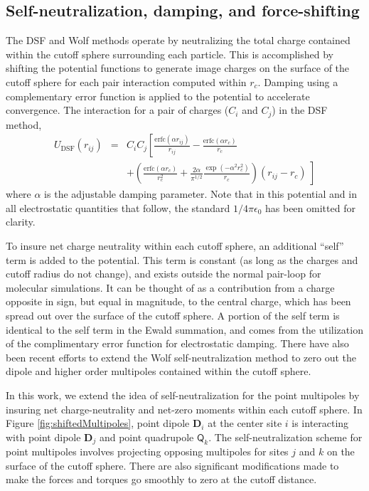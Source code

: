 \subsection{Self-neutralization, damping, and force-shifting}
The DSF and Wolf methods operate by neutralizing the total charge
contained within the cutoff sphere surrounding each particle.  This is
accomplished by shifting the potential functions to generate image
charges on the surface of the cutoff sphere for each pair interaction
computed within $r_c$. Damping using a complementary error function is
applied to the potential to accelerate convergence. The interaction
for a pair of charges ($C_i$ and $C_j$) in the DSF method,
\begin{eqnarray}
U_\mathrm{DSF}(r_{ij}) &=&  C_i C_j \left[
\frac{\mathrm{erfc}\left(\alpha r_{ij}\right)}{r_{ij}} 
- \frac{\mathrm{erfc}\left(\alpha r_c\right)}{r_c} \right.\nonumber \\
& & + \left. \left(\frac{\mathrm{erfc}\left(\alpha r_c\right)}{r_c^2} 
+ \frac{2\alpha}{\pi^{1/2}}
\frac{\exp\left(-\alpha^2r_c^2\right)}{r_c}
\right)\left(r_{ij}-r_c\right)\ \right] 
\label{eq:DSFPot}
\end{eqnarray}
where $\alpha$ is the adjustable damping parameter.  Note that in this
potential and in all electrostatic quantities that follow, the
standard $1/4 \pi \epsilon_{0}$ has been omitted for clarity.

To insure net charge neutrality within each cutoff sphere, an
additional ``self'' term is added to the potential. This term is
constant (as long as the charges and cutoff radius do not change), and
exists outside the normal pair-loop for molecular simulations.  It can
be thought of as a contribution from a charge opposite in sign, but
equal in magnitude, to the central charge, which has been spread out
over the surface of the cutoff sphere.  A portion of the self term is
identical to the self term in the Ewald summation, and comes from the
utilization of the complimentary error function for electrostatic
damping.\cite{deLeeuw80,Wolf99} There have also been recent efforts to
extend the Wolf self-neutralization method to zero out the dipole and
higher order multipoles contained within the cutoff
sphere.\cite{Fukuda11,Fukuda12,Fukuda13}

In this work, we extend the idea of self-neutralization for the point
multipoles by insuring net charge-neutrality and net-zero moments
within each cutoff sphere.  In Figure \ref{fig:shiftedMultipoles}, point dipole 
$\mathbf{D}_i$ at the center site $i$ is interacting with point dipole
$\mathbf{D}_j$ and point quadrupole  $\mathsf{Q}_k$.  The
self-neutralization scheme for point multipoles involves projecting
opposing multipoles for sites $j$ and $k$ on the surface of the cutoff
sphere.  There are also significant modifications made to make the
forces and torques go smoothly to zero at the cutoff distance.

